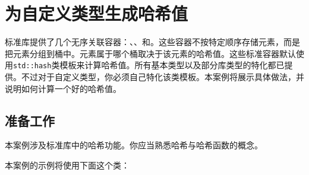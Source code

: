 
\section{为自定义类型生成哈希值}



标准库提供了几个无序关联容器：、、和。这些容器不按特定顺序存储元素，而是把元素分组到桶中。元素属于哪个桶取决于该元素的哈希值。这些标准容器默认使用\texttt{std::\allowbreak{}hash}类模板来计算哈希值。所有基本类型以及部分库类型的特化都已提供。不过对于自定义类型，你必须自己特化该类模板。本案例将展示具体做法，并说明如何计算一个好的哈希值。



\subsection{准备工作}



本案例涉及标准库中的哈希功能。你应当熟悉哈希与哈希函数的概念。



本案例的示例将使用下面这个类：


